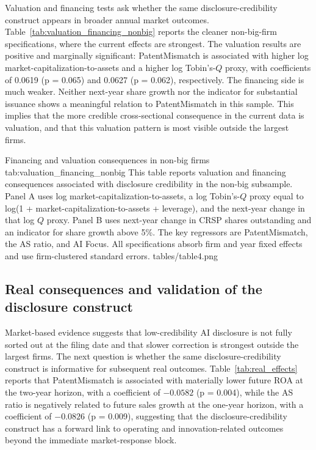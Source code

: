 Valuation and financing tests ask whether the same disclosure-credibility construct appears in broader annual market outcomes. Table~\ref{tab:valuation_financing_nonbig} reports the cleaner non-big-firm specifications, where the current effects are strongest. The valuation results are positive and marginally significant: PatentMismatch is associated with higher log market-capitalization-to-assets and a higher log Tobin's-$Q$ proxy, with coefficients of 0.0619 (p = 0.065) and 0.0627 (p = 0.062), respectively. The financing side is much weaker. Neither next-year share growth nor the indicator for substantial issuance shows a meaningful relation to PatentMismatch in this sample. This implies that the more credible cross-sectional consequence in the current data is valuation, and that this valuation pattern is most visible outside the largest firms.

\tablepdf
{Financing and valuation consequences in non-big firms}
{tab:valuation_financing_nonbig}
{This table reports valuation and financing consequences associated with disclosure credibility in the non-big subsample. Panel A uses log market-capitalization-to-assets, a log Tobin's-$Q$ proxy equal to log(1 + market-capitalization-to-assets + leverage), and the next-year change in that log $Q$ proxy. Panel B uses next-year change in CRSP shares outstanding and an indicator for share growth above 5\%. The key regressors are PatentMismatch, the AS ratio, and AI Focus. All specifications absorb firm and year fixed effects and use firm-clustered standard errors.}
{tables/table4.png}

\subsection{Real consequences and validation of the disclosure construct}

Market-based evidence suggests that low-credibility AI disclosure is not fully sorted out at the filing date and that slower correction is strongest outside the largest firms. The next question is whether the same disclosure-credibility construct is informative for subsequent real outcomes. Table~\ref{tab:real_effects} reports that PatentMismatch is associated with materially lower future ROA at the two-year horizon, with a coefficient of $-0.0582$ (p = 0.004), while the AS ratio is negatively related to future sales growth at the one-year horizon, with a coefficient of $-0.0826$ (p = 0.009), suggesting that the disclosure-credibility construct has a forward link to operating and innovation-related outcomes beyond the immediate market-response block.

